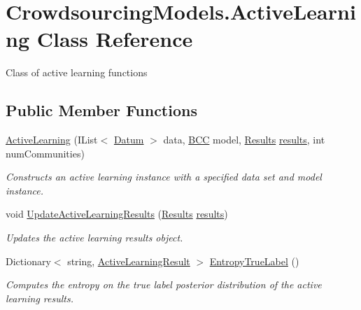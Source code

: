 \hypertarget{class_crowdsourcing_models_1_1_active_learning}{}\section{Crowdsourcing\+Models.\+Active\+Learning Class Reference}
\label{class_crowdsourcing_models_1_1_active_learning}


Class of active learning functions  


\subsection*{Public Member Functions}
\begin{DoxyCompactItemize}
\item 
\hyperlink{class_crowdsourcing_models_1_1_active_learning_aef1d1c747eea4e3171b37781023e3ec4}{Active\+Learning} (I\+List$<$ \hyperlink{class_crowdsourcing_models_1_1_datum}{Datum} $>$ data, \hyperlink{class_crowdsourcing_models_1_1_b_c_c}{B\+C\+C} model, \hyperlink{class_crowdsourcing_models_1_1_results}{Results} \hyperlink{class_crowdsourcing_models_1_1_active_learning_a4f3abbe012947f48a2476130e2dd9d1e}{results}, int num\+Communities)
\begin{DoxyCompactList}\small\item\em Constructs an active learning instance with a specified data set and model instance. \end{DoxyCompactList}\item 
void \hyperlink{class_crowdsourcing_models_1_1_active_learning_ad7b1f2430964dab42489d47ffc4cb4cc}{Update\+Active\+Learning\+Results} (\hyperlink{class_crowdsourcing_models_1_1_results}{Results} \hyperlink{class_crowdsourcing_models_1_1_active_learning_a4f3abbe012947f48a2476130e2dd9d1e}{results})
\begin{DoxyCompactList}\small\item\em Updates the active learning results object. \end{DoxyCompactList}\item 
Dictionary$<$ string, \hyperlink{class_crowdsourcing_models_1_1_active_learning_result}{Active\+Learning\+Result} $>$ \hyperlink{class_crowdsourcing_models_1_1_active_learning_aca2a388ec0e95835d2d89270c4f171e5}{Entropy\+True\+Label} ()
\begin{DoxyCompactList}\small\item\em Computes the entropy on the true label posterior distribution of the active learning results. \end{DoxyCompactList}\end{DoxyCompactItemize}
